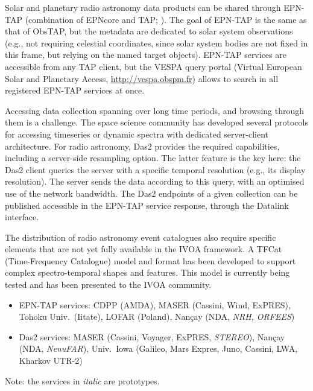 \documentclass[11pt,a4paper]{ivoatex/ivoa}
\begin{document}
Solar and planetary radio astronomy data products can be shared through EPN-TAP (combination of EPNcore 
and TAP; \cite{std:EPNTAP}). The goal of EPN-TAP is the same as that of ObsTAP, but the metadata are 
dedicated to solar system observations (e.g., not requiring celestial coordinates, since solar system 
bodies are not fixed in this frame, but relying on the named target objects). EPN-TAP services are 
accessible from any TAP client, but the VESPA query portal (Virtual European Solar and Planetary Access, 
\url{http://vespa.obspm.fr}) allows to search in all registered EPN-TAP services at once.

Accessing data collection spanning over long time periods, and browsing through them is a challenge. 
The space science community has developed several protocols for accessing timeseries or dynamic spectra 
with dedicated server-client architecture. For radio astronomy, Das2 \citep{10.1002/essoar.10500359.1} 
provides the required capabilities, including a server-side resampling option. The latter feature is 
the key here: the Das2 client queries the server with a specific temporal resolution (e.g., its display
resolution). The server sends the data according to this query, with an optimised use of the network
bandwidth. The Das2 endpoints of a given collection can be published accessible in the EPN-TAP service 
response, through the Datalink interface.

The distribution of radio astronomy event catalogues also require specific elements that are not yet
fully available in the IVOA framework. A TFCat (Time-Frequency Catalogue) model and format has been 
developed to support complex spectro-temporal shapes and features. This model is currently being 
tested and has been presented to the IVOA community. 

\begin{itemize}
\item EPN-TAP services: CDPP (AMDA), MASER (Cassini, Wind, ExPRES), Tohoku Univ.\ (Iitate), LOFAR 
(Poland), Nan\c cay (NDA, \emph{NRH, ORFEES})
\item Das2 services: MASER (Cassini, Voyager, ExPRES, \emph{STEREO}), Nan\c cay (NDA, \emph{NenuFAR}), 
Univ.\ Iowa (Galileo, Mars Expres, Juno, Cassini, LWA, Kharkov UTR-2)
\end{itemize}
Note: the services in \emph{italic} are prototypes.
\end{document}
